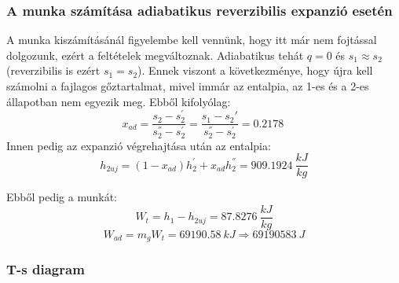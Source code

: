 \subsubsection{A munka számítása adiabatikus reverzibilis expanzió esetén}
A munka kiszámításánál figyelembe kell vennünk, hogy itt már nem fojtással dolgozunk, ezért a feltételek megváltoznak. Adiabatikus tehát $q = 0$ és $s_{1}\approx s_{2}$ (reverzibilis is ezért $s_{1} = s_{2}$). Ennek viszont a következménye, hogy újra kell számolni a fajlagos gőztartalmat, mivel immár az entalpia, az 1-es és a 2-es állapotban nem egyezik meg.
Ebből kifolyólag:
\begin{equation}
	x_{ad} =
	\dfrac{s_{2} - s_{2}^{'}}{s_{2}^{''} - s_{2}^{'}} 
	=
	\dfrac{s_{1} - s_{2}{'}}{s_{2}^{''} - s_{2}^{'}}
	=
	\SI{0,2178}{}
\end{equation}
Innen pedig az expanzió végrehajtása után az entalpia:
\begin{equation}
	h_{2uj} = (1 - x_{ad})h_{2}^{'}+x_{ad}h_{2}^{''}
	=
	\SI{909,1924}{\dfrac{kJ}{kg}}
\end{equation}

\noindent Ebből pedig a munkát:
\begin{equation}
	W_{t} = h_{1} - h_{2uj}
	=
	\SI{87,8276}{\dfrac{kJ}{kg}}
\end{equation}
\begin{equation}
	W_{ad} = m_{g}W_{t} = \SI{69190,58}{kJ} \Rightarrow \SI{69190583}{J}
\end{equation}
\subsubsection{T-s diagram}